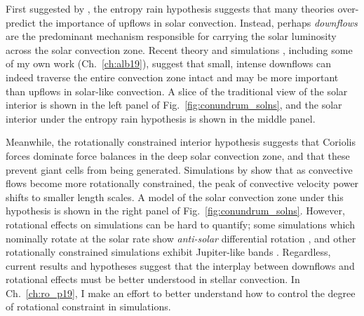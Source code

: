 First suggested by \cite{spruit1997}, the entropy rain hypothesis suggests that many theories over-predict the importance of upflows in solar convection.
Instead, perhaps \emph{downflows} are the predominant mechanism responsible for carrying the solar luminosity across the solar convection zone.
Recent theory and simulations \citep{brandenburg2016, kapyla&all2017}, including some of my own work (Ch.~\ref{ch:alb19}), suggest that small, intense downflows can indeed traverse the entire convection zone intact and may be more important than upflows in solar-like convection.
A slice of the traditional view of the solar interior is shown in the left panel of Fig.~\ref{fig:conundrum_solns}, and the solar interior under the entropy rain hypothesis is shown in the middle panel.

Meanwhile, the rotationally constrained interior hypothesis suggests that Coriolis forces dominate force balances in the deep solar convection zone, and that these prevent giant cells from being generated.
Simulations by \cite{featherstone&hindman2016a, featherstone&hindman2016b} show that as convective flows become more rotationally constrained, the peak of convective velocity power shifts to smaller length scales.
A model of the solar convection zone under this hypothesis is shown in the right panel of Fig.~\ref{fig:conundrum_solns}.
However, rotational effects on simulations can be hard to quantify; some simulations which nominally rotate at the solar rate show \emph{anti-solar} differential rotation \citep{gastine&all2014}, and other rotationally constrained simulations exhibit Jupiter-like bands \citep{brun&all2017}.
Regardless, current results and hypotheses suggest that the interplay between downflows and rotational effects must be better understood in stellar convection.
In Ch.~\ref{ch:ro_p19}, I make an effort to better understand how to control the degree of rotational constraint in simulations.

